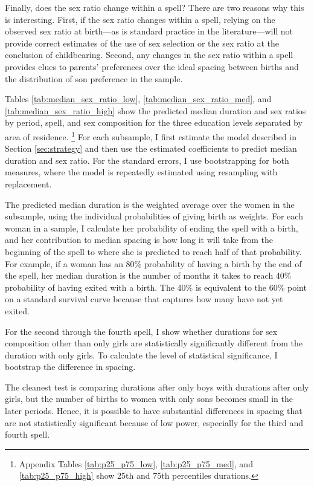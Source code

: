 \documentclass[12pt,letterpaper]{article}
\begin{document}
Finally, does the sex ratio change within a spell?
There are two reasons why this is interesting.
First, if the sex ratio changes within a spell, relying on the observed sex
ratio at birth---as is standard practice in the literature---will not provide
correct estimates of the use of sex selection or the sex ratio at
the conclusion of childbearing.
Second, any changes in the sex ratio within a spell provides clues
to parents' preferences over the ideal spacing between births and the
distribution of son preference in the sample.


Tables \ref{tab:median_sex_ratio_low}, \ref{tab:median_sex_ratio_med}, and
\ref{tab:median_sex_ratio_high}
show the predicted median duration and sex ratios by period, spell, and sex 
composition for the three education levels separated by area of residence.%
\footnote{
Appendix Tables \ref{tab:p25_p75_low}, \ref{tab:p25_p75_med}, and 
\ref{tab:p25_p75_high} show 25th and 75th percentiles durations.
} 
For each subsample, I first estimate the model described in Section 
\ref{sec:strategy} and then use the estimated coefficients to predict 
median duration and sex ratio.
For the standard errors, I use bootstrapping for both measures,
where the model is repeatedly estimated using resampling with replacement.


The predicted median duration is the weighted average over the women in the 
subsample, using the individual probabilities of giving birth as weights.
For each woman in a sample, I calculate her probability of ending the spell 
with a birth, and her contribution to median spacing is how long it will take
from the beginning of the spell to where she is predicted to reach half of that probability.
For example, if a woman has an 80\% probability of having a birth by the end of 
the spell, her median duration is the number of months it takes to reach
40\% probability of having exited with a birth.
The 40\% is equivalent to the 60\% point on a standard survival curve because that 
captures how many have not yet exited.

For the second through the fourth spell, I show whether durations for sex 
composition other than only girls are statistically significantly different 
from the duration with only girls.
To calculate the level of statistical significance, I bootstrap the
difference in spacing.
 
The cleanest test is comparing durations after only boys with durations after
only girls, but the number of births to women with only sons becomes small 
in the later periods.
Hence, it is possible to have substantial differences in spacing that are
not statistically significant because of low power, especially for the third 
and fourth spell.
\end{document}
